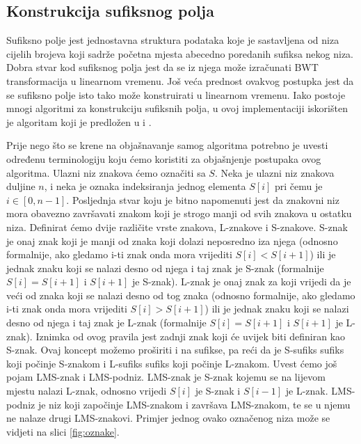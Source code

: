 \subsection{Konstrukcija sufiksnog polja}
Sufiksno polje jest jednostavna struktura podataka koje je sastavljena od niza cijelih brojeva koji sadrže početna mjesta abecedno poredanih sufiksa nekog niza. Dobra stvar kod sufiksnog polja jest da se iz njega može izračunati BWT transformacija u linearnom vremenu. Još veća prednost ovakvog postupka jest da se sufiksno polje isto tako može konstruirati u linearnom vremenu. Iako postoje mnogi algoritmi za konstrukciju sufiksnih polja, u ovoj implementaciji iskorišten je algoritam koji je predložen u \cite{sais1} i \cite{sais2}. 

Prije nego što se krene na objašnavanje samog algoritma potrebno je uvesti određenu terminologiju koju ćemo koristiti za objašnjenje postupaka ovog algoritma. Ulazni niz znakova ćemo označiti sa $S$. Neka je ulazni niz znakova duljine $n$, i neka je oznaka indeksiranja jednog elementa $S[i]$ pri čemu je $i \in [0,n-1]$. Posljednja stvar koju je bitno napomenuti jest da znakovni niz mora obavezno završavati znakom koji je strogo manji od svih znakova u ostatku niza.  Definirat ćemo dvije različite vrste znakova, L-znakove i S-znakove. S-znak je onaj znak koji je manji od znaka koji dolazi neposredno iza njega (odnosno formalnije, ako gledamo i-ti znak onda mora vrijediti $S[i]<S[i+1]$) ili je jednak znaku koji se nalazi desno od njega i taj znak je S-znak (formalnije $S[i]=S[i+1]$ i $S[i+1]$ je S-znak). L-znak je onaj znak za koji vrijedi da je veći od znaka koji se nalazi desno od tog znaka (odnosno formalnije, ako gledamo i-ti znak onda mora vrijediti $S[i]>S[i+1]$) ili je jednak znaku koji se nalazi desno od njega i taj znak je L-znak (formalnije $S[i]=S[i+1]$ i $S[i+1]$ je L-znak). Iznimka od ovog pravila jest zadnji znak koji će uvijek biti definiran kao S-znak. Ovaj koncept možemo proširiti i na sufikse, pa reći da je S-sufiks sufiks koji počinje S-znakom i L-sufiks sufiks koji počinje L-znakom. Uvest ćemo još pojam LMS-znak i LMS-podniz. LMS-znak je S-znak kojemu se na lijevom mjestu nalazi L-znak, odnosno vrijedi $S[i]$ je S-znak i $S[i-1]$ je L-znak. LMS-podniz je niz koji započinje LMS-znakom i završava LMS-znakom, te se u njemu ne nalaze drugi LMS-znakovi. Primjer jednog ovako označenog niza može se vidjeti na slici \ref{fig:oznake}.

\\

